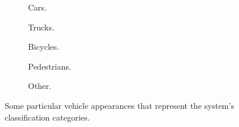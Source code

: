 \begin{figure}[!t]
	\centering
	\begin{adjustbox}{minipage=\linewidth,scale=0.8}
	\begin{subfigure}[!h]{0.25\textwidth}
	
	\caption{Cars.}
	\end{subfigure}
	\quad
	\begin{subfigure}[!h]{0.25\textwidth}
	
	\caption{Trucks.}
	\end{subfigure}
	\quad
	\begin{subfigure}[!h]{0.21\textwidth}
	
	\caption{Bicycles.}
	\end{subfigure}
	\hfill
	\begin{subfigure}[!h]{0.3\textwidth}
	
	\caption{Pedestrians.}
	\end{subfigure}
	\quad
	\begin{subfigure}[!h]{0.5\textwidth}
	
	\caption{Other.}
	\end{subfigure}

	\caption{Some particular vehicle appearances that represent the system's classification categories.\label{fig:types}}
    \end{adjustbox}
\end{figure}



